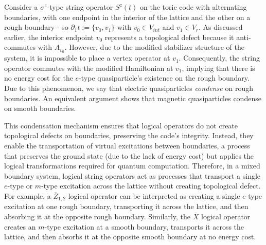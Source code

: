 \documentclass[12pt]{article}
\theoremstyle{definition}
\begin{document}
Consider a $\sigma^z$-type string operator $S^z(t)$ on the toric code with alternating boundaries, with one endpoint in the interior of the lattice and the other on a rough boundary - so $\partial_1t := \{v_0,v_1\}$ with $v_0\in V_{int}$ and $v_1\in V_r$. As discussed earlier, the interior endpoint $v_0$ represents a topological defect because it anti-commutes with $A_{v_0}$. However, due to the modified stabilizer structure of the system, it is impossible to place a vertex operator at $v_1$. Consequently, the string operator commutes with the modified Hamiltonian at $v_1$, implying that there is no energy cost for the $e$-type quasiparticle’s existence on the rough boundary. Due to this phenomenon, we say that electric quasiparticles \emph{condense} on rough boundaries. An equivalent argument shows that magnetic quasiparticles condense on smooth boundaries.\newline

This condensation mechanism ensures that logical operators do not create topological defects on boundaries, preserving the code’s integrity. Instead, they enable the transportation of virtual excitations between boundaries, a process that preserves the ground state (due to the lack of energy cost) but applies the logical transformations required for quantum computation. Therefore, in a mixed boundary system, logical string operators act as processes that transport a single $e$-type or $m$-type excitation across the lattice without creating topological defect. For example, a $\overline{Z}_{1,2}$ logical operator can be interpreted as creating a single $e$-type excitation at one rough boundary, transporting it across the lattice, and then absorbing it at the opposite rough boundary. Similarly, the $\overline{X}$ logical operator creates an $m$-type excitation at a smooth boundary, transports it across the lattice, and then absorbs it at the opposite smooth boundary at no energy cost.\newline
\end{document}

